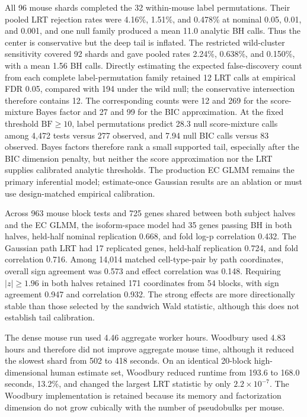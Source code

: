 \documentclass[11pt]{article}
\begin{document}
All 96 mouse shards completed the 32 within-mouse label permutations. Their pooled LRT rejection rates were 4.16\%, 1.51\%, and 0.478\% at nominal 0.05, 0.01, and 0.001, and one null family produced a mean 11.0 analytic BH calls. Thus the center is conservative but the deep tail is inflated. The restricted wild-cluster sensitivity covered 92 shards and gave pooled rates 2.24\%, 0.638\%, and 0.150\%, with a mean 1.56 BH calls. Directly estimating the expected false-discovery count from each complete label-permutation family retained 12 LRT calls at empirical FDR 0.05, compared with 194 under the wild null; the conservative intersection therefore contains 12. The corresponding counts were 12 and 269 for the score-mixture Bayes factor and 27 and 99 for the BIC approximation. At the fixed threshold \(\mathrm{BF}\geq10\), label permutations predict 28.3 null score-mixture calls among 4,472 tests versus 277 observed, and 7.94 null BIC calls versus 83 observed. Bayes factors therefore rank a small supported tail, especially after the BIC dimension penalty, but neither the score approximation nor the LRT supplies calibrated analytic thresholds. The production EC GLMM remains the primary inferential model; estimate-once Gaussian results are an ablation or must use design-matched empirical calibration.

Across 963 mouse block tests and 725 genes shared between both subject halves and the EC GLMM, the isoform-space model had 35 genes passing BH in both halves, held-half nominal replication 0.668, and fold log-p correlation 0.432. The Gaussian path LRT had 17 replicated genes, held-half replication 0.724, and fold correlation 0.716. Among 14,014 matched cell-type-pair by path coordinates, overall sign agreement was 0.573 and effect correlation was 0.148. Requiring \(|z|\geq1.96\) in both halves retained 171 coordinates from 54 blocks, with sign agreement 0.947 and correlation 0.932. The strong effects are more directionally stable than those selected by the sandwich Wald statistic, although this does not establish tail calibration.

The dense mouse run used 4.46 aggregate worker hours. Woodbury used 4.83 hours and therefore did not improve aggregate mouse time, although it reduced the slowest shard from 502 to 418 seconds. On an identical 20-block high-dimensional human estimate set, Woodbury reduced runtime from 193.6 to 168.0 seconds, 13.2\%, and changed the largest LRT statistic by only \(2.2\times10^{-7}\). The Woodbury implementation is retained because its memory and factorization dimension do not grow cubically with the number of pseudobulks per mouse.
\end{document}
